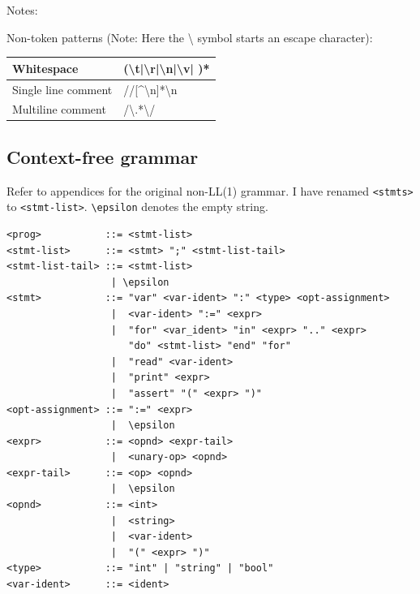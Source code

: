 \documentclass[a4paper,11pt]{article}
\begin{document}
Notes:

Non-token patterns (Note: Here the \textbackslash{} symbol starts an escape character):
\begin{table}[h!]
\begin{tabular}{| l | l |}
    \hline
    Whitespace & (\textbackslash t|\textbackslash r|\textbackslash n|\textbackslash v| )* \\
    \hline
    Single line comment & //[\^{}\textbackslash n]*\textbackslash n \\
    \hline
    Multiline comment & /\textbackslash *.*\textbackslash */ \\
    \hline
\end{tabular}
\end{table}

\subsection{Context-free grammar}

Refer to appendices for the original non-LL(1) grammar. I have renamed \verb,<stmts>, to \verb,<stmt-list>,. \verb,\epsilon, denotes the empty string.

\newpage

\begin{verbatim}
<prog>           ::= <stmt-list>
<stmt-list>      ::= <stmt> ";" <stmt-list-tail>
<stmt-list-tail> ::= <stmt-list>
                  | \epsilon
<stmt>           ::= "var" <var-ident> ":" <type> <opt-assignment>
                  |  <var-ident> ":=" <expr>
                  |  "for" <var_ident> "in" <expr> ".." <expr>
                     "do" <stmt-list> "end" "for"
                  |  "read" <var-ident>
                  |  "print" <expr>
                  |  "assert" "(" <expr> ")"
<opt-assignment> ::= ":=" <expr>
                  |  \epsilon
<expr>           ::= <opnd> <expr-tail>
                  |  <unary-op> <opnd>
<expr-tail>      ::= <op> <opnd>
                  |  \epsilon
<opnd>           ::= <int>
                  |  <string>
                  |  <var-ident>
                  |  "(" <expr> ")"
<type>           ::= "int" | "string" | "bool"
<var-ident>      ::= <ident>
\end{verbatim}
\end{document}
